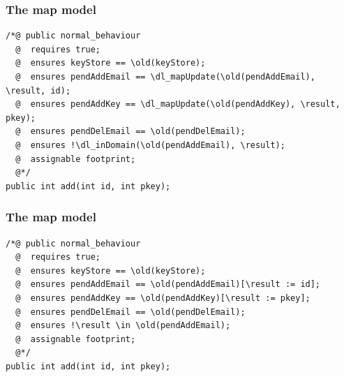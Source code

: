\documentclass{beamer}
\begin{document}
\begin{frame}[fragile]
  \frametitle{The map model}
\begin{lstlisting}
/*@ public normal_behaviour
  @  requires true;
  @  ensures keyStore == \old(keyStore);
  @  ensures pendAddEmail == \dl_mapUpdate(\old(pendAddEmail), \result, id);
  @  ensures pendAddKey == \dl_mapUpdate(\old(pendAddKey), \result, pkey);
  @  ensures pendDelEmail == \old(pendDelEmail);
  @  ensures !\dl_inDomain(\old(pendAddEmail), \result);
  @  assignable footprint;
  @*/
public int add(int id, int pkey);
\end{lstlisting}
\end{frame}

\begin{frame}[fragile]
  \frametitle{The map model}
\begin{lstlisting}[mathescape=true]
/*@ public normal_behaviour
  @  requires true;
  @  ensures keyStore == \old(keyStore);
  @  ensures pendAddEmail == \old(pendAddEmail)[\result := id];
  @  ensures pendAddKey == \old(pendAddKey)[\result := pkey];
  @  ensures pendDelEmail == \old(pendDelEmail);
  @  ensures !\result \in \old(pendAddEmail);
  @  assignable footprint;
  @*/
public int add(int id, int pkey);
\end{lstlisting}
\end{frame}
\end{document}
